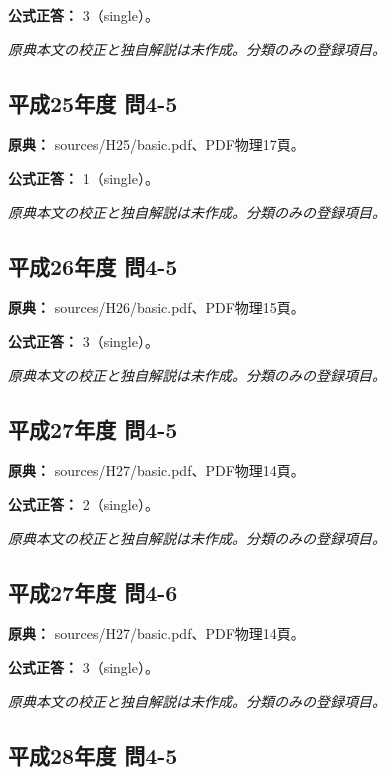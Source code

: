 \textbf{公式正答：} 3（single）。

\par\textit{原典本文の校正と独自解説は未作成。分類のみの登録項目。}

\subsection{平成25年度 問4-5}
\label{q:h25-reg-basic-4-5}

\noindent\textbf{原典：} sources/H25/basic.pdf、PDF物理17頁。

\textbf{公式正答：} 1（single）。

\par\textit{原典本文の校正と独自解説は未作成。分類のみの登録項目。}

\subsection{平成26年度 問4-5}
\label{q:h26-reg-basic-4-5}

\noindent\textbf{原典：} sources/H26/basic.pdf、PDF物理15頁。

\textbf{公式正答：} 3（single）。

\par\textit{原典本文の校正と独自解説は未作成。分類のみの登録項目。}

\subsection{平成27年度 問4-5}
\label{q:h27-reg-basic-4-5}

\noindent\textbf{原典：} sources/H27/basic.pdf、PDF物理14頁。

\textbf{公式正答：} 2（single）。

\par\textit{原典本文の校正と独自解説は未作成。分類のみの登録項目。}

\subsection{平成27年度 問4-6}
\label{q:h27-reg-basic-4-6}

\noindent\textbf{原典：} sources/H27/basic.pdf、PDF物理14頁。

\textbf{公式正答：} 3（single）。

\par\textit{原典本文の校正と独自解説は未作成。分類のみの登録項目。}

\subsection{平成28年度 問4-5}
\label{q:h28-reg-basic-4-5}

